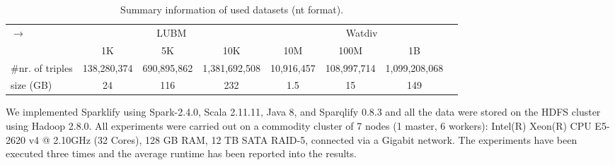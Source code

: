 
\begin{table}
\centering
\begin{tabularx}{\textwidth}{Xccccccc}
\toprule
\multirow{2}{*}{$\longrightarrow$} & \multicolumn{3}{c|}{LUBM} & \multicolumn{4}{c}{Watdiv} \\
\cline{2-8}  \rule{0pt}{10pt}
&   \scriptsize{1K} & \scriptsize{5K} & \scriptsize{10K}  & \scriptsize{10M} &\scriptsize{100M} &\scriptsize{1B} &\\
\midrule
\scriptsize{\#nr. of triples}& \scriptsize{138,280,374} & \scriptsize{690,895,862} & \scriptsize{1,381,692,508} & \scriptsize{10,916,457} & \scriptsize{108,997,714} & \scriptsize{1,099,208,068} &  \\
\scriptsize{size (GB)}  & \scriptsize{24} & \scriptsize{116} & \scriptsize{232} & \scriptsize{1.5} &\scriptsize{15} &\scriptsize{149} &\\
\bottomrule
\end{tabularx}
{\caption{Summary information of used datasets (nt format).}\label{tab:dataset_info}}
\end{table}


We implemented Sparklify using Spark-2.4.0, Scala 2.11.11, Java 8, and Sparqlify 0.8.3 and all the data were stored on the HDFS cluster using Hadoop 2.8.0.
All experiments were carried out on a commodity cluster of 7 nodes (1 master, 6 workers): Intel(R) Xeon(R) CPU E5-2620 v4 @ 2.10GHz (32 Cores), 128 GB RAM, 12 TB SATA RAID-5, connected via a Gigabit network.
The experiments have been executed three times and the average runtime has been reported into the results.

